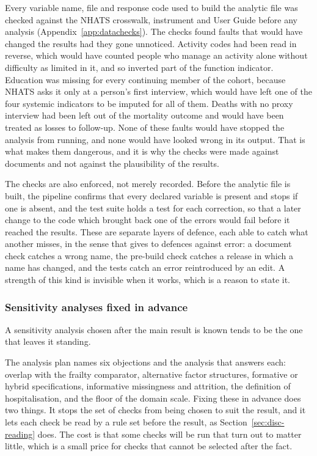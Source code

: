 Every variable name, file and response code used to build the analytic file was
checked against the NHATS crosswalk, instrument and User Guide before any analysis
(Appendix~\ref{app:datachecks}). The checks found faults that would have changed
the results had they gone unnoticed. Activity codes had been read in reverse, which
would have counted people who manage an activity alone without difficulty as
limited in it, and so inverted part of the function indicator. Education was
missing for every continuing member of the cohort, because NHATS asks it only at a
person's first interview, which would have left one of the four systemic indicators
to be imputed for all of them. Deaths with no proxy interview had been left out of
the mortality outcome and would have been treated as losses to follow-up. None of
these faults would have stopped the analysis from running, and none would have
looked wrong in its output. That is what makes them dangerous, and it is why the
checks were made against documents and not against the plausibility of the results.

The checks are also enforced, not merely recorded. Before the analytic file is
built, the pipeline confirms that every declared variable is present and stops if
one is absent, and the test suite holds a test for each correction, so that a later
change to the code which brought back one of the errors would fail before it reached
the results. These are separate layers of defence, each able to catch what another
misses, in the sense that \citet{reason_1990} gives to defences against error: a
document check catches a wrong name, the pre-build check catches a release in which
a name has changed, and the tests catch an error reintroduced by an edit. A
strength of this kind is invisible when it works, which is a reason to state it.

\subsubsection{Sensitivity analyses fixed in advance}

A sensitivity analysis chosen after the main result is known tends to be the one
that leaves it standing.

The analysis plan names six objections and the analysis that answers each:
overlap with the frailty comparator, alternative factor structures, formative or
hybrid specifications, informative missingness and attrition, the definition of
hospitalisation, and the floor of the domain scale. Fixing these in advance does
two things. It stops the set of checks from being chosen to suit the result, and it
lets each check be read by a rule set before the result, as
Section~\ref{sec:disc-reading} does. The cost is that some checks will be run that
turn out to matter little, which is a small price for checks that cannot be
selected after the fact.

